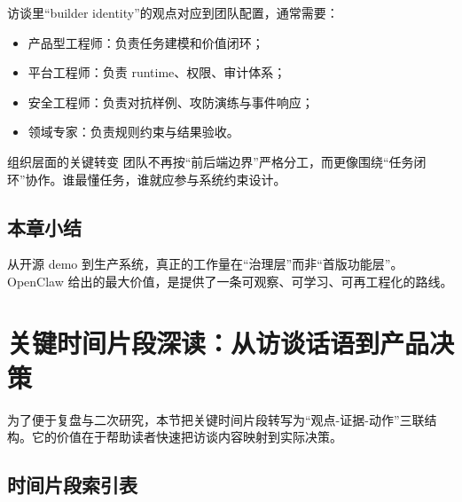 \documentclass[a4paper]{article}
\begin{document}
访谈里“builder identity”的观点对应到团队配置，通常需要：
\begin{itemize}
    \item 产品型工程师：负责任务建模和价值闭环；
    \item 平台工程师：负责 runtime、权限、审计体系；
    \item 安全工程师：负责对抗样例、攻防演练与事件响应；
    \item 领域专家：负责规则约束与结果验收。
\end{itemize}

\begin{knowledgebox}{组织层面的关键转变}
团队不再按“前后端边界”严格分工，而更像围绕“任务闭环”协作。谁最懂任务，谁就应参与系统约束设计。
\end{knowledgebox}

\subsection{本章小结}
从开源 demo 到生产系统，真正的工作量在“治理层”而非“首版功能层”。OpenClaw 给出的最大价值，是提供了一条可观察、可学习、可再工程化的路线。

\section{关键时间片段深读：从访谈话语到产品决策}

为了便于复盘与二次研究，本节把关键时间片段转写为“观点-证据-动作”三联结构。它的价值在于帮助读者快速把访谈内容映射到实际决策。

\subsection{时间片段索引表}
\end{document}
